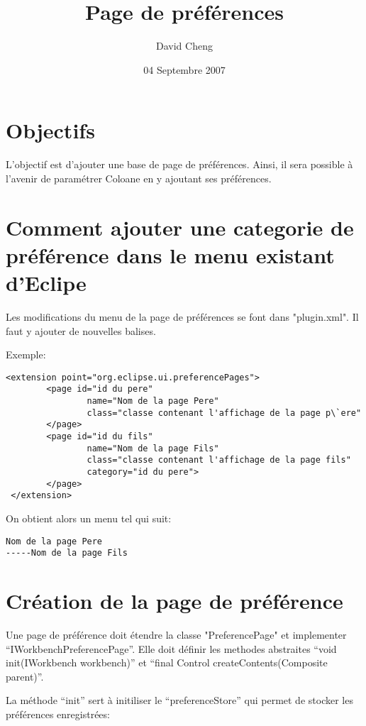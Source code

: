 \documentclass{article}
\title{Page de pr\'ef\'erences}
\author{David Cheng}
\date{04 Septembre 2007}
\begin{document}
\maketitle

\section{Objectifs}

L'objectif est d'ajouter une base de page de pr\'ef\'erences.
Ainsi, il sera possible \`a l'avenir de param\'etrer Coloane en y ajoutant ses pr\'ef\'erences.



\section{Comment ajouter une categorie de pr\'ef\'erence dans le menu existant d'Eclipe} 

Les modifications du menu de la page de pr\'ef\'erences se font dans "plugin.xml".
Il faut y ajouter de nouvelles balises.

Exemple:
\begin{verbatim}
<extension point="org.eclipse.ui.preferencePages">
        <page id="id du pere"
                name="Nom de la page Pere"
                class="classe contenant l'affichage de la page p\`ere"
        </page>
        <page id="id du fils"
                name="Nom de la page Fils"
                class="classe contenant l'affichage de la page fils"
                category="id du pere">
        </page>
 </extension>
\end{verbatim}

On obtient alors un menu tel qui suit:
\begin{verbatim}
Nom de la page Pere
-----Nom de la page Fils
\end{verbatim}

\section{Cr\'eation de la page de pr\'ef\'erence}

Une page de pr\'ef\'erence doit \'etendre la classe "PreferencePage" et implementer ``IWorkbenchPreferencePage''.
Elle doit d\'efinir les methodes abstraites ``void init(IWorkbench workbench)'' et ``final Control createContents(Composite parent)''.

La m\'ethode ``init'' sert \`a initiliser le ``preferenceStore'' qui permet de stocker les pr\'ef\'erences enregistr\'ees:
\end{document}
